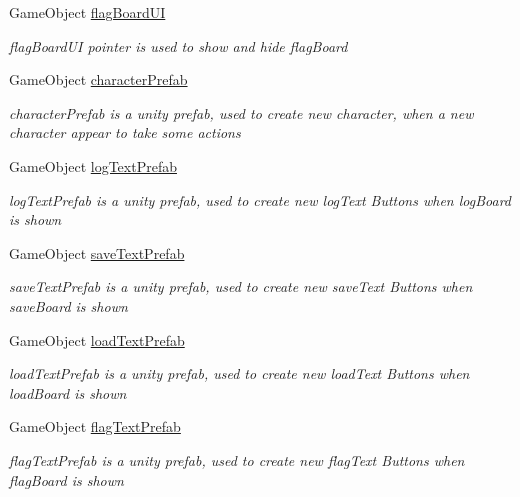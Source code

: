 \begin{DoxyCompactItemize}
Game\+Object \hyperlink{classdoki_unity_1_1_world_control_a99dcc33e772703c54d35cf0afe37bc8d}{flag\+Board\+UI}
\begin{DoxyCompactList}\small\item\em flag\+Board\+UI pointer is used to show and hide flag\+Board \end{DoxyCompactList}\item 
Game\+Object \hyperlink{classdoki_unity_1_1_world_control_a9bb72d8cad2cc61503e3855ea47d6e6c}{character\+Prefab}
\begin{DoxyCompactList}\small\item\em character\+Prefab is a unity prefab, used to create new character, when a new character appear to take some actions \end{DoxyCompactList}\item 
Game\+Object \hyperlink{classdoki_unity_1_1_world_control_a181a566112a87ee1d59a57120f50191c}{log\+Text\+Prefab}
\begin{DoxyCompactList}\small\item\em log\+Text\+Prefab is a unity prefab, used to create new log\+Text Buttons when log\+Board is shown \end{DoxyCompactList}\item 
Game\+Object \hyperlink{classdoki_unity_1_1_world_control_a4b65998064f8be0d9c5671305f06d0ce}{save\+Text\+Prefab}
\begin{DoxyCompactList}\small\item\em save\+Text\+Prefab is a unity prefab, used to create new save\+Text Buttons when save\+Board is shown \end{DoxyCompactList}\item 
Game\+Object \hyperlink{classdoki_unity_1_1_world_control_a8b463cfe781120e636a40d52df4dcd7b}{load\+Text\+Prefab}
\begin{DoxyCompactList}\small\item\em load\+Text\+Prefab is a unity prefab, used to create new load\+Text Buttons when load\+Board is shown \end{DoxyCompactList}\item 
Game\+Object \hyperlink{classdoki_unity_1_1_world_control_a60f26fb8915ffa6d19a9811fb782b7ab}{flag\+Text\+Prefab}
\begin{DoxyCompactList}\small\item\em flag\+Text\+Prefab is a unity prefab, used to create new flag\+Text Buttons when flag\+Board is shown \end{DoxyCompactList}\item 

\end{DoxyCompactItemize}
